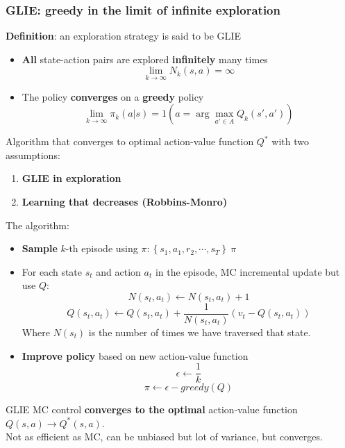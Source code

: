 \subsubsection{GLIE: greedy in the limit of infinite exploration}
    \textbf{Definition}: an exploration strategy is said to be GLIE
    \begin{itemize}
        \item \textbf{All} state-action pairs are explored \textbf{infinitely} many times
        $$\lim_{k\rightarrow\infty}N_k(s,a)=\infty$$
        \item The policy \textbf{converges} on a \textbf{greedy} policy
        $$\lim_{k\rightarrow\infty}\pi_k(a|s)=1(a=\arg\max_{a'\in A}Q_k(s',a'))$$
    \end{itemize}
    Algorithm that converges to optimal action-value function $Q^*$ with two assumptions:
    \begin{enumerate}
        \item \textbf{GLIE in exploration}
        \item \textbf{Learning that decreases (Robbins-Monro)}
    \end{enumerate}
    The algorithm:
    \begin{itemize}
        \item \textbf{Sample} $k$-th episode using $\pi:\left\{s_1,a_1,r_2,\cdots,s_T\right\}~\pi$
        \item For each state $s_t$ and action $a_t$ in the episode, MC incremental update but use $Q$:
        $$N(s_t,a_t)\leftarrow N(s_t,a_t)+1$$
        $$Q(s_t,a_t)\leftarrow Q(s_t,a_t)+\frac{1}{N(s_t,a_t)}(v_t-Q(s_t,a_t))$$
        Where $N(s_t)$ is the number of times we have traversed that state.\\
        \item \textbf{Improve policy} based on new action-value function
        $$\epsilon\leftarrow\frac{1}{k}$$
        $$\pi\leftarrow\epsilon-greedy(Q)$$
    \end{itemize}
    GLIE MC control \textbf{converges to the optimal} action-value function $Q(s,a)\rightarrow Q^*(s,a)$.\\
    Not as efficient as MC, can be unbiased but lot of variance, but converges.\\

